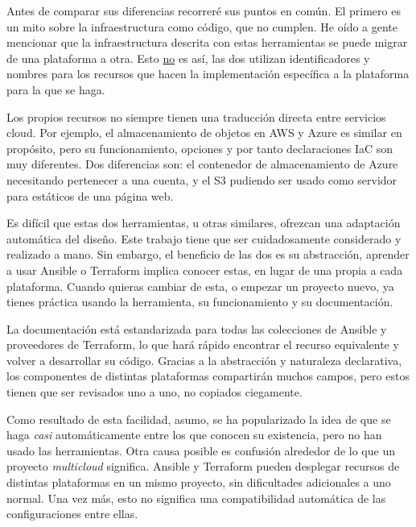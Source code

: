 \documentclass[11pt]{article}
\begin{document}
\begin{flushleft}
Antes de comparar sus diferencias recorreré sus puntos en común. El primero es un mito sobre la infraestructura como código, que no cumplen. He oído a gente mencionar que la infraestructura descrita con estas herramientas se puede migrar de una plataforma a otra. Esto \underline{no} es así, las dos utilizan identificadores y nombres para los recursos que hacen la implementación específica a la plataforma para la que se haga. 
\linebreak

Los propios recursos no siempre tienen una traducción directa entre servicios cloud. Por ejemplo, el almacenamiento de objetos en AWS y Azure es similar en propósito, pero su funcionamiento, opciones y por tanto declaraciones IaC son muy diferentes. Dos diferencias son: el contenedor de almacenamiento de Azure necesitando pertenecer a una cuenta, y el S3 pudiendo ser usado como servidor para estáticos de una página web. 
\linebreak

Es difícil que estas dos herramientas, u otras similares, ofrezcan una adaptación automática del diseño. Este trabajo tiene que ser cuidadosamente considerado y realizado a mano. Sin embargo, el beneficio de las dos es su abstracción, aprender a usar Ansible o Terraform implica conocer estas, en lugar de una propia a cada plataforma. Cuando quieras cambiar de esta, o empezar un proyecto nuevo, ya tienes práctica usando la herramienta, su funcionamiento y su documentación.
\linebreak

La documentación está estandarizada para todas las colecciones de Ansible y proveedores de Terraform, lo que hará rápido encontrar el recurso equivalente y volver a desarrollar su código. Gracias a la abstracción y naturaleza declarativa, los componentes de distintas plataformas compartirán muchos campos, pero estos tienen que ser revisados uno a uno, no copiados ciegamente.
\linebreak

Como resultado de esta facilidad, asumo, se ha popularizado la idea de que se haga \textit{casi} automáticamente entre los que conocen su existencia, pero no han usado las herramientas. Otra causa posible es confusión alrededor de lo que un proyecto \textit{multicloud} significa. Ansible y Terraform pueden desplegar recursos de distintas plataformas en un mismo proyecto, sin dificultades adicionales a uno normal. Una vez más, esto no significa una compatibilidad automática de las configuraciones entre ellas.




\end{flushleft}
\end{document}
